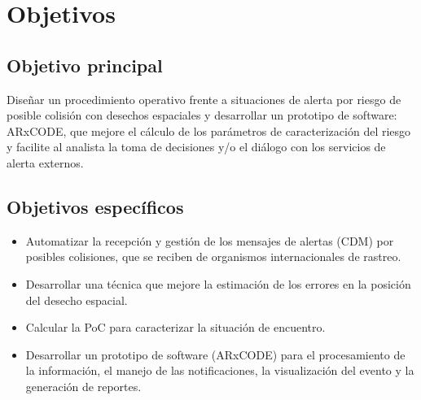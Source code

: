 \section{Objetivos}

\subsection*{Objetivo principal}
Dise\~nar un procedimiento operativo frente a situaciones de alerta por riesgo de posible
colisi\'on con desechos espaciales y desarrollar un prototipo de software: ARxCODE, que
mejore el c\'alculo de los par\'ametros de caracterizaci\'on del riesgo y facilite al analista la
toma de decisiones y/o el di\'alogo con los servicios de alerta externos.\\

\subsection*{Objetivos espec\'ificos}
\begin{itemize}
\item Automatizar la recepci\'on y gesti\'on de los mensajes de alertas (CDM) por posibles
colisiones, que se reciben de organismos internacionales de rastreo.
\item Desarrollar una t\'ecnica que mejore la estimaci\'on de los errores en la posici\'on del desecho espacial.
\item Calcular la \ac{PoC} para caracterizar la situaci\'on de encuentro.
\item Desarrollar un prototipo de software (ARxCODE) para el procesamiento de la informaci\'on, el manejo de las notificaciones, la visualizaci\'on del evento y la generaci\'on de reportes.
\end{itemize}

\endinput